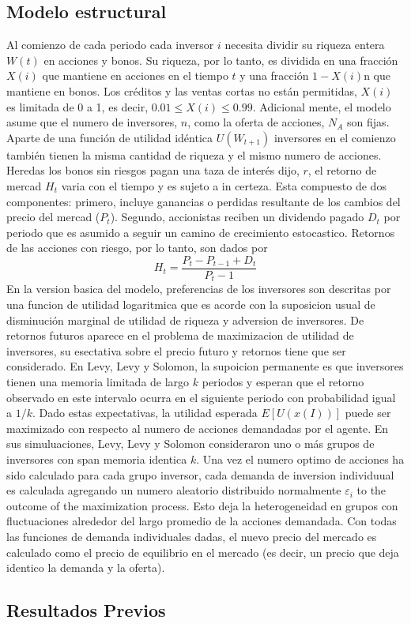 \documentclass[12pt,a4paper]{article}
\begin{document}
\subsection*{Modelo estructural}
\quad Al comienzo de cada periodo cada inversor $i$ necesita dividir su riqueza entera $W(t)$ en acciones y bonos. Su riqueza, por lo tanto, es dividida en una fracción $X(i)$ que mantiene en acciones en el tiempo $t$ y una fracción $1-X(i)$n que mantiene en bonos. Los créditos y las ventas cortas no están permitidas, $X(i)$ es limitada de 0 a 1, es decir, $0.01\leq X(i)\leq 0.99$. Adicional mente, el modelo asume que el numero de inversores, $n$, como la oferta de acciones, $N_A$ son fijas. Aparte de una función de utilidad idéntica $U(W_{t+1})$ inversores en el comienzo también tienen la misma cantidad de riqueza y el mismo numero de acciones. Heredas los bonos sin riesgos pagan una taza de interés dijo, $r$, el retorno de mercad $H_t$ varia con el tiempo y es sujeto a in certeza. Esta compuesto de dos componentes: primero, incluye ganancias o perdidas resultante de los cambios del precio del mercad ($P_t$). Segundo, accionistas reciben un dividendo pagado $D_t$ por periodo que es asumido a seguir un camino de crecimiento estocastico. Retornos de las acciones con riesgo, por lo tanto, son dados por
\begin{equation}
H_t=\frac{P_t-P_{t-1}+D_t}{P_t-1}
\end{equation}
\quad En la version basica del modelo, preferencias de los inversores son descritas por una funcion de utilidad logaritmica que es acorde con la suposicion usual de disminución marginal de utilidad de riqueza y adversion de inversores. De retornos futuros aparece en el problema de maximizacion de utilidad de inversores, su esectativa sobre el precio futuro y retornos tiene que ser considerado. En Levy, Levy y Solomon, la supoicion permanente es que inversores tienen una memoria limitada de largo $k$ periodos y esperan que el retorno observado en este intervalo ocurra en el siguiente periodo con probabilidad igual a $1/k$. Dado estas expectativas, la utilidad esperada $E[U(x(I))] $ puede ser maximizado con respecto al numero de acciones demandadas por el agente. En sus simuluaciones, Levy, Levy y Solomon consideraron uno o más grupos de inversores con span memoria identica $k$. Una vez el numero  optimo de  acciones ha sido calculado para cada grupo inversor, cada demanda de inversion individuual es calculada agregando un numero aleatorio distribuido normalmente $\varepsilon_i$ to the outcome of the maximization process. Esto deja la heterogeneidad en grupos con fluctuaciones alrededor del largo promedio de la acciones demandada. Con todas las funciones de demanda individuales dadas, el nuevo precio del mercado es calculado como el precio de equilibrio en el mercado (es decir, un precio que deja identico la demanda y la oferta).
\subsection*{Resultados Previos}
\newpage 
 

\end{document}
